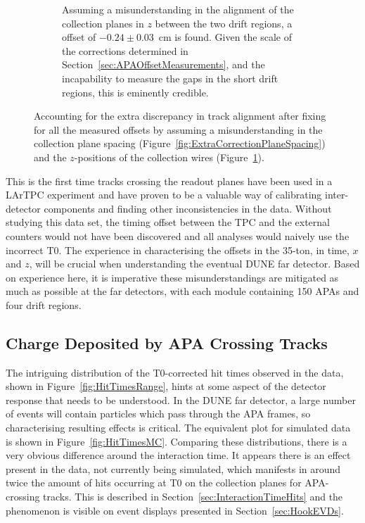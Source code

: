 \begin{figure}
\begin{subfigure}[t]{0.48\linewidth}
    \caption{Assuming a misunderstanding in the alignment of the collection planes in $z$ between the two drift regions, a offset of $-0.24\pm0.03$~cm is found.  Given the scale of the corrections determined in Section~\ref{sec:APAOffsetMeasurements}, and the incapability to measure the gaps in the short drift regions, this is eminently credible.}
    \label{fig:ExtraCorrectionWire}
  \end{subfigure}
  \caption[Accounting for the extra discrepancy in track alignment after fixing for all the measured offsets by assuming a misunderstanding in the collection plane spacing and the $z$-positions of the collection wires.]{Accounting for the extra discrepancy in track alignment after fixing for all the measured offsets by assuming a misunderstanding in the collection plane spacing (Figure~\ref{fig:ExtraCorrectionPlaneSpacing}) and the $z$-positions of the collection wires (Figure~\ref{fig:ExtraCorrectionWire}).}
  \label{fig:ExtraCorrections}
\end{figure}

This is the first time tracks crossing the readout planes have been used in a LArTPC experiment and have proven to be a valuable way of calibrating inter-detector components and finding other inconsistencies in the data.  Without studying this data set, the timing offset between the TPC and the external counters would not have been discovered and all analyses would naively use the incorrect T0.  The experience in characterising the offsets in the 35-ton, in time, $x$ and $z$, will be crucial when understanding the eventual DUNE far detector.  Based on experience here, it is imperative these misunderstandings are mitigated as much as possible at the far detectors, with each module containing 150 APAs and four drift regions.

\subsection{Charge Deposited by APA Crossing Tracks}\label{sec:APACrossingCharge}

The intriguing distribution of the T0-corrected hit times observed in the data, shown in Figure~\ref{fig:HitTimesRange}, hints at some aspect of the detector response that needs to be understood.  In the DUNE far detector, a large number of events will contain particles which pass through the APA frames, so characterising resulting effects is critical.  The equivalent plot for simulated data is shown in Figure~\ref{fig:HitTimesMC}.  Comparing these distributions, there is a very obvious difference around the interaction time. It appears there is an effect present in the data, not currently being simulated, which manifests in around twice the amount of hits occurring at T0 on the collection planes for APA-crossing tracks.  This is described in Section~\ref{sec:InteractionTimeHits} and the phenomenon is visible on event displays presented in Section~\ref{sec:HookEVDs}.

